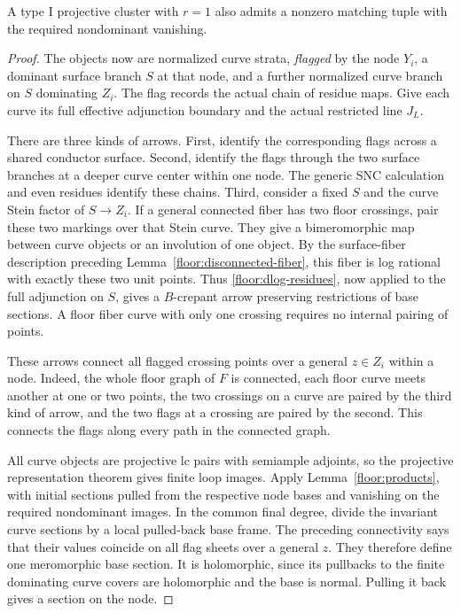 \begin{lemma}
\label{floor:projective-r1-I}
A type I projective cluster with $r=1$
also admits a nonzero matching tuple with
the required nondominant vanishing.
\end{lemma}

\begin{proof}
The objects now are normalized curve
strata, \emph{flagged} by the node $Y_i$,
a dominant surface branch $S$ at that
node, and a further normalized curve
branch on $S$ dominating $Z_i$.  The
flag records the actual chain of residue
maps.  Give each curve its full effective
adjunction boundary and the actual
restricted line $J_L$.

There are three kinds of arrows.
First, identify the corresponding
flags across a shared conductor surface.
Second, identify the flags through the
two surface branches at a deeper curve
center within one node.  The generic SNC
calculation and even residues identify
these chains.  Third, consider a fixed
$S$ and the curve Stein factor of
$S\to Z_i$.  If a general connected
fiber has two floor crossings, pair
these two markings over that Stein
curve.  They give a bimeromorphic map
between curve objects or an involution
of one object.  By the surface-fiber
description preceding
Lemma~\ref{floor:disconnected-fiber},
this fiber is log rational with exactly
these two unit points.  Thus
\eqref{floor:dlog-residues}, now applied
to the full adjunction on $S$, gives a
$B$-crepant arrow preserving restrictions
of base sections.  A floor fiber curve
with only one crossing requires no
internal pairing of points.

These arrows connect all flagged
crossing points over a general
$z\in Z_i$ within a node.  Indeed, the
whole floor graph of $F$ is connected,
each floor curve meets another at one
or two points, the two crossings on a
curve are paired by the third kind of
arrow, and the two flags at a crossing
are paired by the second.  This connects
the flags along every path in the
connected graph.

All curve objects are projective lc
pairs with semiample adjoints, so the
projective representation theorem gives
finite loop images.  Apply
Lemma~\ref{floor:products}, with initial
sections pulled from the respective
node bases and vanishing on the required
nondominant images.  In the common final
degree, divide the invariant curve
sections by a local pulled-back base
frame.  The preceding connectivity says
that their values coincide on all flag
sheets over a general $z$.  They
therefore define one meromorphic base
section.  It is holomorphic, since its
pullbacks to the finite dominating
curve covers are holomorphic and the
base is normal.  Pulling it back gives
a section on the node.


\end{proof}
